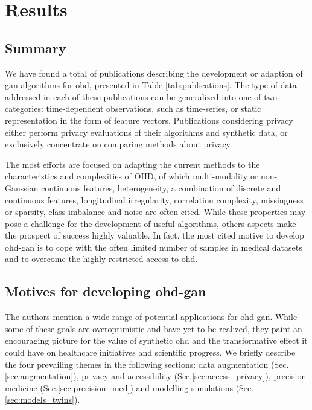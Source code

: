\section{Results}
    \subsection{Summary}
        We have found a total of  publications describing the development or adaption of \gls{gan} algorithms for \gls{ohd}, presented in Table \ref{tab:publications}. The type of data addressed in each of these publications can be generalized into one of two categories: time-dependent observations, such as time-series, or static representation in the form of feature vectors. Publications considering privacy either perform privacy evaluations of their algorithms and synthetic data, or exclusively concentrate on comparing methods about privacy.
        
        The most efforts are focused on adapting the current methods to the characteristics and complexities of OHD, of which multi-modality or non-Gaussian continuous features, heterogeneity, a combination of discrete and continuous features, longitudinal irregularity, correlation complexity, missingness or sparsity, class imbalance and noise are often cited. While these properties may pose a challenge for the development of useful algorithms, others aspects make the prospect of success highly valuable. In fact, the most cited motive to develop \gls{ohd-gan} is to cope with the often limited number of samples in medical datasets and to overcome the highly restricted access to \gls{ohd}.\par
        
        \subsection{Motives for developing \gls{ohd}-\gls{gan}}
The authors mention a wide range of potential applications for \gls{ohd-gan}. While some of these goals are overoptimistic and have yet to be realized, they paint an encouraging picture for the value of synthetic \gls{ohd} and the transformative effect it could have on healthcare initiatives and scientific progress. We briefly describe the four prevailing themes in the following sections: data augmentation (Sec.\ref{sec:augmentation}), privacy and accessibility (Sec.\ref{sec:access_privacy}), precision medicine (Sec.\ref{sec:precision_med}) and  modelling simulations (Sec.\ref{sec:models_twins}). 

